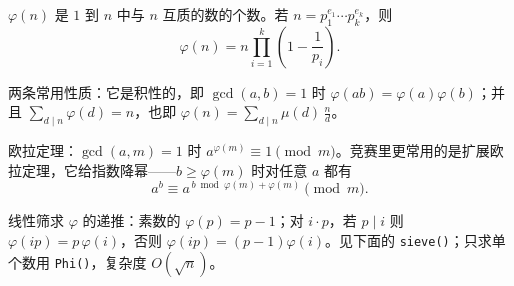 $\varphi(n)$ 是 $1$ 到 $n$ 中与 $n$ 互质的数的个数。若 $n=p_1^{e_1}\cdots p_k^{e_k}$，则
\[ \varphi(n)=n\prod_{i=1}^{k}\left(1-\frac1{p_i}\right). \]

两条常用性质：它是积性的，即 $\gcd(a,b)=1$ 时 $\varphi(ab)=\varphi(a)\varphi(b)$；并且 $\sum_{d\mid n}\varphi(d)=n$，也即 $\varphi(n)=\sum_{d\mid n}\mu(d)\,\tfrac nd$。

欧拉定理：$\gcd(a,m)=1$ 时 $a^{\varphi(m)}\equiv1\pmod m$。竞赛里更常用的是扩展欧拉定理，它给指数降幂——$b\ge\varphi(m)$ 时对任意 $a$ 都有
\[ a^{b}\equiv a^{\,b\bmod\varphi(m)+\varphi(m)}\pmod m . \]

线性筛求 $\varphi$ 的递推：素数的 $\varphi(p)=p-1$；对 $i\cdot p$，若 $p\mid i$ 则 $\varphi(ip)=p\,\varphi(i)$，否则 $\varphi(ip)=(p-1)\varphi(i)$。见下面的 \texttt{sieve()}；只求单个数用 \texttt{Phi()}，复杂度 $O(\sqrt n)$。

